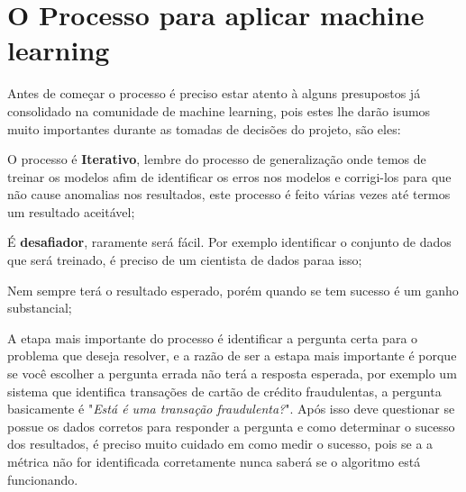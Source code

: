 \section{O Processo para aplicar machine learning}
\label{sec:howtoapplyml}

Antes de começar o processo é preciso estar atento à alguns presupostos já consolidado na comunidade de machine learning, pois estes lhe darão isumos muito importantes durante 
as tomadas de decisões do projeto, são eles: 
\begin{alineas}
    \item O processo é \textbf{Iterativo}, lembre do processo de generalização onde temos de treinar os modelos afim de identificar os erros nos modelos e corrigi-los para que não cause
    anomalias nos resultados, este processo é feito várias vezes até termos um resultado aceitável;
    \item É  \textbf{desafiador}, raramente será fácil. Por exemplo identificar o conjunto de dados que será treinado, é preciso de um cientista de dados paraa isso; 
    \item Nem sempre terá o resultado esperado, porém quando se tem sucesso é um ganho substancial;
\end{alineas}
  
A etapa mais importante do processo é identificar a pergunta certa para o problema que deseja resolver, e a razão de ser a estapa mais importante é 
porque se você escolher a pergunta errada não terá a resposta esperada, por exemplo um sistema que identifica transações de cartão de crédito fraudulentas, a 
pergunta basicamente é "\textit{Está é uma transação fraudulenta?}". Após isso deve questionar se possue os dados corretos para responder a pergunta e como determinar o sucesso dos resultados,
é preciso muito cuidado em como medir o sucesso, pois se a a métrica não for identificada corretamente nunca saberá se o algoritmo está funcionando.


